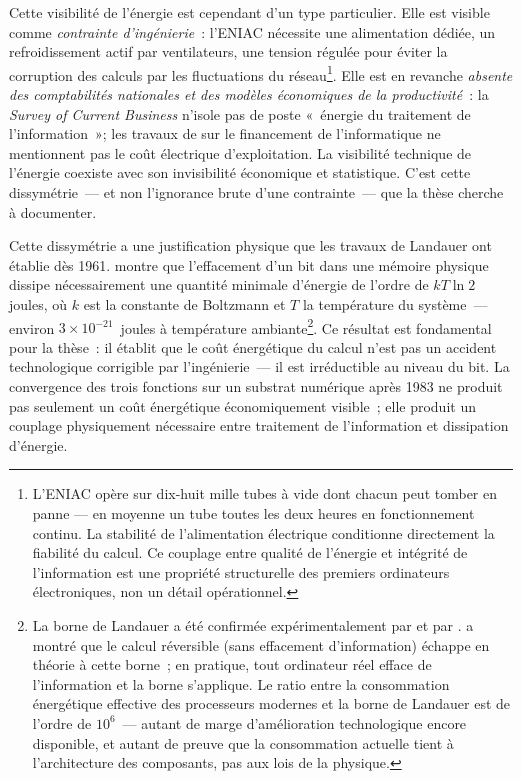 Cette visibilité de l'énergie est cependant d'un type particulier. Elle est visible comme \emph{contrainte d'ingénierie}~: l'ENIAC nécessite une alimentation dédiée, un refroidissement actif par ventilateurs, une tension régulée pour éviter la corruption des calculs par les fluctuations du réseau\footnote{L'ENIAC opère sur dix-huit mille tubes à vide dont chacun peut tomber en panne --- en moyenne un tube toutes les deux heures en fonctionnement continu. La stabilité de l'alimentation électrique conditionne directement la fiabilité du calcul. Ce couplage entre qualité de l'énergie et intégrité de l'information est une propriété structurelle des premiers ordinateurs électroniques, non un détail opérationnel.}. Elle est en revanche \emph{absente des comptabilités nationales et des modèles économiques de la productivité}~: la \emph{Survey of Current Business} n'isole pas de poste «~énergie du traitement de l'information~»; les travaux de \textcite{flamm_creating_1988} sur le financement de l'informatique ne mentionnent pas le coût électrique d'exploitation. La visibilité technique de l'énergie coexiste avec son invisibilité économique et statistique. C'est cette dissymétrie~--- et non l'ignorance brute d'une contrainte~--- que la thèse cherche à documenter.

%
Cette dissymétrie a une justification physique que les travaux de Landauer ont établie dès 1961. \textcite{landauer_irreversibility_1961} montre que l'effacement d'un bit dans une mémoire physique dissipe nécessairement une quantité minimale d'énergie de l'ordre de $kT\ln 2$ joules, où $k$ est la constante de Boltzmann et $T$ la température du système~--- environ $3 \times 10^{-21}$~joules à température ambiante\footnote{La borne de Landauer a été confirmée expérimentalement par \textcite{berut_experimental_2012} et par \textcite{jun_high_2014}. \textcite{bennett_thermodynamics_1982} a montré que le calcul réversible (sans effacement d'information) échappe en théorie à cette borne~; en pratique, tout ordinateur réel efface de l'information et la borne s'applique. Le ratio entre la consommation énergétique effective des processeurs modernes et la borne de Landauer est de l'ordre de $10^{6}$~--- autant de marge d'amélioration technologique encore disponible, et autant de preuve que la consommation actuelle tient à l'architecture des composants, pas aux lois de la physique.}. Ce résultat est fondamental pour la thèse~: il établit que le coût énergétique du calcul n'est pas un accident technologique corrigible par l'ingénierie~--- il est irréductible au niveau du bit. La convergence des trois fonctions sur un substrat numérique après 1983 ne produit pas seulement un coût énergétique économiquement visible~; elle produit un couplage physiquement nécessaire entre traitement de l'information et dissipation d'énergie.

